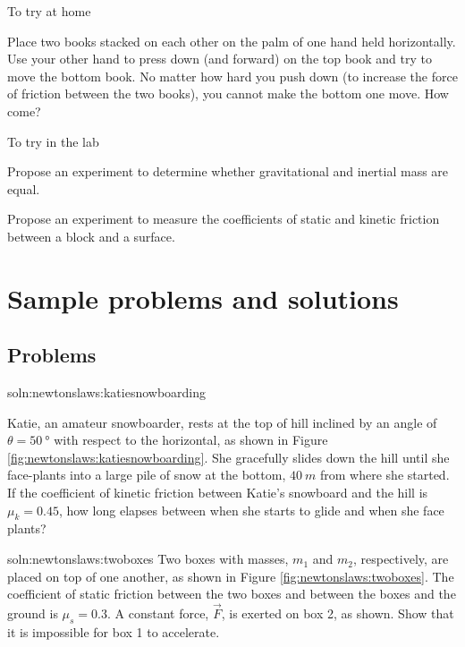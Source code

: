 \begin{chapteractivity}{To try at home}
{
\item Place two books stacked on each other on the palm of one hand held horizontally. Use your other hand to press down (and forward) on the top book and try to move the bottom book. No matter how hard you push down (to increase the force of friction between the two books), you cannot make the bottom one move. How come?
}
\end{chapteractivity}

\begin{chapteractivity}{To try in the lab}
{
\item Propose an experiment to determine whether gravitational and inertial mass are equal.
\item Propose an experiment to measure the coefficients of static and kinetic friction between a block and a surface.
}
\end{chapteractivity}
\newpage
\section{Sample problems and solutions}
\subsection{Problems}
\begin{problem}{soln:newtonslaws:katiesnowboarding}{\label{prob:newtonslaws:katiesnowboarding}

Katie, an amateur snowboarder, rests at the top of hill inclined by an angle of $\theta =\SI{50}{\degree}$ with respect to the horizontal, as shown in Figure \ref{fig:newtonslaws:katiesnowboarding}. She gracefully slides down the hill until she face-plants into a large pile of snow at the bottom, $\SI{40}{m}$ from where she started. If the coefficient of kinetic friction between Katie's snowboard and the hill is $\mu_k=0.45$, how long elapses between when she starts to glide and when she face plants?}
\end{problem}


\begin{problem}{soln:newtonslaws:twoboxes}{
\label{prob:newtonslaws:twoboxes}
Two boxes with masses, $m_1$ and $m_2$, respectively, are placed on top of one another, as shown in Figure \ref{fig:newtonslaws:twoboxes}. The coefficient of static friction between the two boxes and between the boxes and the ground is $\mu_s=0.3$. A constant force, $\vec F$, is exerted on box 2, as shown. Show that it is impossible for box 1 to accelerate.
}
\end{problem}

